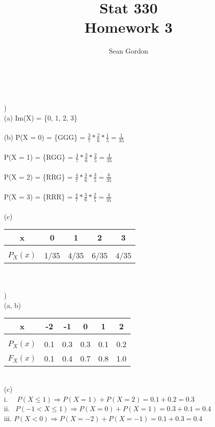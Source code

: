 \documentclass[12pt]{article}
\title{Stat 330\\Homework 3}
\author{Sean Gordon}
\begin{document}
\maketitle


\noindent\hrulefill \\
\indent \indent  \hrulefill \indent \indent \indent \\


)\\
\indent (a) Im(X) = \{0, 1, 2, 3\}\\\\

\indent        (b) P(X = 0) =  \{GGG\} = {\Large$ \frac{3}{7}*\frac{2}{6}*\frac{1}{5} = \frac{1}{35}$}\\\\
\indent \indent P(X = 1) =  \{RGG\} = {\Large$ \frac{4}{7}*\frac{3}{6}*\frac{2}{5} = \frac{4}{35}$}\\\\
\indent \indent P(X = 2) =  \{RRG\} = {\Large$ \frac{4}{7}*\frac{3}{6}*\frac{3}{5} = \frac{6}{35}$}\\\\
\indent \indent P(X = 3) =  \{RRR\} = {\Large$ \frac{4}{7}*\frac{3}{6}*\frac{2}{5} = \frac{4}{35}$}\\\\


\indent (c)
\begin{tabular}{c|cccc}
 x & 0 & 1 & 2 & 3 \\
 \hline &&&&\\[-1em]
$P_X(x)$ & 1/35 & 4/35 & 6/35 & 4/35\\
\end{tabular}\\


\noindent \hrulefill \\


)\\

\indent (a, b) 
\begin{tabular}{c|ccccc}
 x & -2 & -1 & 0 & 1 & 2 \\
 \hline &&&&&\\[-1em]
$P_X(x)$ & 0.1 & 0.3 & 0.3 & 0.1 & 0.2\\
$F_X(x)$ & 0.1 & 0.4 & 0.7 & 0.8 & 1.0\\
\end{tabular}\\


\indent (c) \\
\indent \indent i. \ \ $P(X\le 1) \Rightarrow P(X = 1) + P(X = 2) = 0.1+0.2 = 0.3$\\[.4em]
\indent \indent ii. \ $P(-1 < X \le 1) \Rightarrow P(X=0)+P(X=1) = 0.3+0.1 = 0.4$\\[.4em]
\indent \indent iii. $P(X < 0) \Rightarrow P(X=-2)+P(X=-1) = 0.1+0.3 = 0.4$\\
\end{document}
